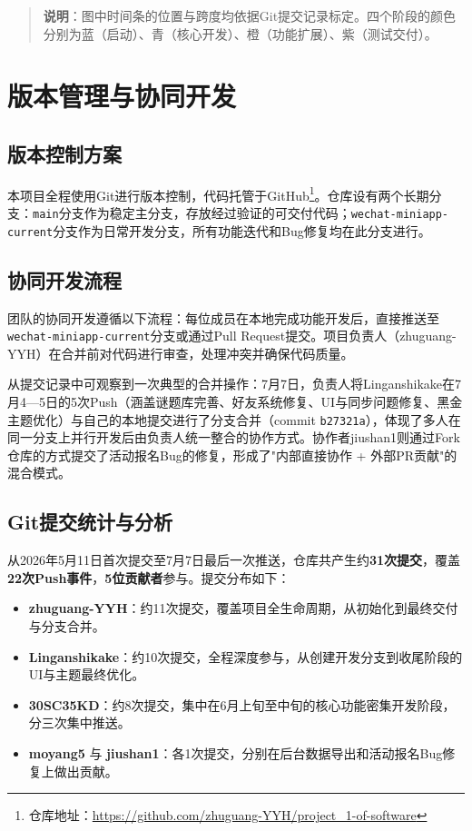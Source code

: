 \documentclass[a4paper,12pt]{article}
\begin{document}
\begin{quote}
\textbf{说明}：图中时间条的位置与跨度均依据Git提交记录标定。四个阶段的颜色分别为蓝（启动）、青（核心开发）、橙（功能扩展）、紫（测试交付）。
\end{quote}

\section{版本管理与协同开发}

\subsection{版本控制方案}

本项目全程使用Git进行版本控制，代码托管于GitHub\footnote{仓库地址：\url{https://github.com/zhuguang-YYH/project\_1-of-software}}。仓库设有两个长期分支：\texttt{main}分支作为稳定主分支，存放经过验证的可交付代码；\texttt{wechat-miniapp-current}分支作为日常开发分支，所有功能迭代和Bug修复均在此分支进行。

\subsection{协同开发流程}

团队的协同开发遵循以下流程：每位成员在本地完成功能开发后，直接推送至\texttt{wechat-miniapp-current}分支或通过Pull Request提交。项目负责人（zhuguang-YYH）在合并前对代码进行审查，处理冲突并确保代码质量。

从提交记录中可观察到一次典型的合并操作：7月7日，负责人将Linganshikake在7月4—5日的5次Push（涵盖谜题库完善、好友系统修复、UI与同步问题修复、黑金主题优化）与自己的本地提交进行了分支合并（commit \texttt{b27321a}），体现了多人在同一分支上并行开发后由负责人统一整合的协作方式。协作者jiushan1则通过Fork仓库的方式提交了活动报名Bug的修复，形成了"内部直接协作 + 外部PR贡献"的混合模式。

\subsection{Git提交统计与分析}

从2026年5月11日首次提交至7月7日最后一次推送，仓库共产生约\textbf{31次提交}，覆盖\textbf{22次Push事件}，\textbf{5位贡献者}参与。提交分布如下：

\begin{itemize}
  \item \textbf{zhuguang-YYH}：约11次提交，覆盖项目全生命周期，从初始化到最终交付与分支合并。
  \item \textbf{Linganshikake}：约10次提交，全程深度参与，从创建开发分支到收尾阶段的UI与主题最终优化。
  \item \textbf{30SC35KD}：约8次提交，集中在6月上旬至中旬的核心功能密集开发阶段，分三次集中推送。
  \item \textbf{moyang5} 与 \textbf{jiushan1}：各1次提交，分别在后台数据导出和活动报名Bug修复上做出贡献。
\end{itemize}
\end{document}
